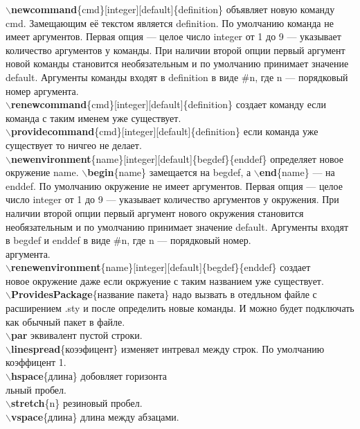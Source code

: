 \documentclass{article}
\newcommand{\bs}{$\backslash$}
\newcommand{\bd}[1]{{\bfseries #1}} %
\newcommand{\bb}[1]{\bd{\bs #1}} %
\begin{document}
\bb{newcommand}\{cmd\}[integer][default]\{definition\} объявляет новую команду
cmd. Замещающим её текстом является definition. По умолчанию команда не имеет
аргументов. Первая опция — целое число integer от 1 до 9 — указывает количество
аргументов у команды. При наличии второй опции первый аргумент новой команды
становится необязательным и по умолчанию принимает значение default. Аргументы
команды входят в definition в виде \#n, где n — порядковый номер аргумента.\\
\bb{renewcommand}\{cmd\}[integer][default]\{definition\} создает команду если
команда с таким именем уже существует.\\
\bb{providecommand}\{cmd\}[integer][default]\{definition\} если команда уже
существует то ничгео не делает.\\

\bb{newenvironment}\{name\}[integer][default]\{begdef\}\{enddef\} определяет
новое окружение name. \bb{begin}\{name\} замещается на begdef,
а \bb{end}\{name\} — на enddef. По умолчанию окружение не имеет аргументов.
Первая опция — целое число integer от 1 до 9 — указывает количество аргументов
у окружения. При наличии второй опции первый аргумент нового окружения
становится необязательным и по умолчанию принимает значение default.
Аргументы входят в begdef и enddef в виде \#n, где n — порядковый номер.\\
аргумента.\\
\bb{renewenvironment}\{name\}[integer][default]\{begdef\}\{enddef\} создает\\
новое окружение даже если окржуение с таким названием уже существует.\\

\bb{ProvidesPackage}\{название пакета\} надо вызвать в отедльном файле
с расширением .sty и после определить новые команды.
И можно будет подключать как обычный пакет в файле.\\

\bb{par} эквивалент пустой строки.\\

\bb{linespread}\{коээфицент\} изменяет интревал между строк.
По умолчанию коэффицент 1.\\
\bb{hspace}\{длина\} добовляет горизонта\\льный пробел.\\
\bb{stretch}\{n\} резиновый пробел.\\
\bb{vspace}\{длина\} длина между абзацами.\\
\end{document}
